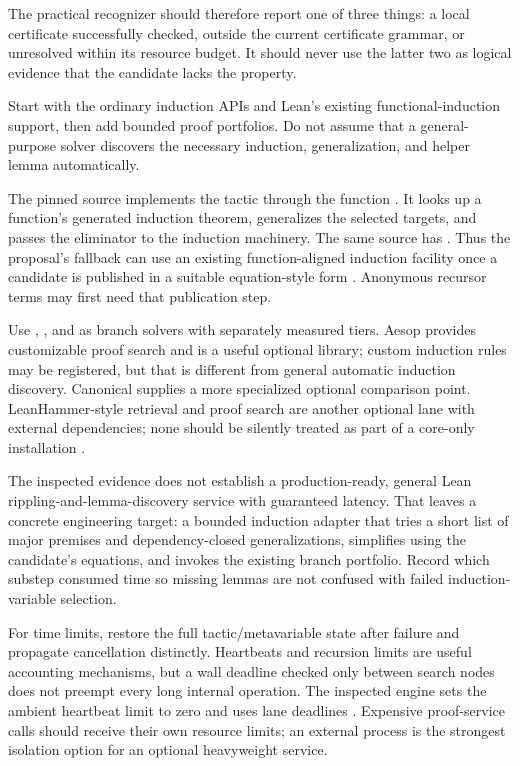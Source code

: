 The practical recognizer should therefore report one of three things: a local certificate successfully checked, outside the current certificate grammar, or unresolved within its resource budget. It should never use the latter two as logical evidence that the candidate lacks the property.

\ans Start with the ordinary induction APIs and Lean's existing functional-induction support, then add bounded proof portfolios. Do not assume that a general-purpose solver discovers the necessary induction, generalization, and helper lemma automatically.

The pinned  source implements the  tactic through the function . It looks up a function's generated induction theorem, generalizes the selected targets, and passes the eliminator to the induction machinery. The same source has . Thus the proposal's fallback can use an existing function-aligned induction facility once a candidate is published in a suitable equation-style form \cite{leanfuninduction}. Anonymous recursor terms may first need that publication step.

Use , , and  as branch solvers with separately measured tiers. Aesop provides customizable proof search and is a useful optional library; custom induction rules may be registered, but that is different from general automatic induction discovery. Canonical supplies a more specialized optional comparison point. LeanHammer-style retrieval and proof search are another optional lane with external dependencies; none should be silently treated as part of a core-only installation \cite{aesop,canonical,leanhammer}.

The inspected evidence does not establish a production-ready, general Lean rippling-and-lemma-discovery service with guaranteed latency. That leaves a concrete engineering target: a bounded induction adapter that tries a short list of major premises and dependency-closed generalizations, simplifies using the candidate's equations, and invokes the existing branch portfolio. Record which substep consumed time so missing lemmas are not confused with failed induction-variable selection.

For time limits, restore the full tactic/metavariable state after failure and propagate cancellation distinctly. Heartbeats and recursion limits are useful accounting mechanisms, but a wall deadline checked only between search nodes does not preempt every long internal operation. The inspected engine sets the ambient heartbeat limit to zero and uses lane deadlines \cite{engine,transaction}. Expensive proof-service calls should receive their own resource limits; an external process is the strongest isolation option for an optional heavyweight service.

